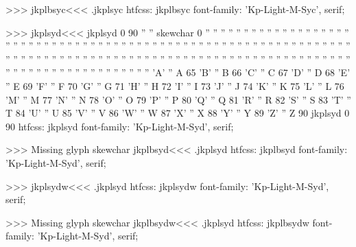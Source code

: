 >>>
\<jkplbsyc\><<<
.jkplsyc
htfcss:  jkplbsyc  font-family: 'Kp-Light-M-Syc', serif;

>>>
\<jkplsyd\><<<
jkplsyd 0 90
'' '' skewchar 0
'' ''  
'' ''  
'' ''  
'' ''  
'' ''  
'' ''  
'' ''  
'' ''  
'' ''  
'' ''  
'' ''  
'' ''  
'' ''  
'' ''  
'' ''  
'' ''  
'' ''  
'' ''  
'' ''  
'' ''  
'' ''  
'' ''  
'' ''  
'' ''  
'' ''  
'' ''  
'' ''  
'' ''  
'' ''  
'' ''  
'' ''  
'' ''  
'' ''  
'' ''  
'' ''  
'' ''  
'' ''  
'' ''  
'' ''  
'' ''  
'' ''  
'' ''  
'' ''  
'' ''  
'' ''  
'' ''  
'' ''  
'' ''  
'' ''  
'' ''  
'' ''  
'' ''  
'' ''  
'' ''  
'' ''  
'' ''  
'' ''  
'' ''  
'' ''  
'' ''  
'' ''  
'' ''  
'' ''  
'' ''  
'A' '' A 65
'B' '' B 66
'C' '' C 67
'D' '' D 68
'E' '' E 69
'F' '' F 70
'G' '' G 71
'H' '' H 72
'I' '' I 73
'J' '' J 74
'K' '' K 75
'L' '' L 76
'M' '' M 77
'N' '' N 78
'O' '' O 79
'P' '' P 80
'Q' '' Q 81
'R' '' R 82
'S' '' S 83
'T' '' T 84
'U' '' U 85
'V' '' V 86
'W' '' W 87
'X' '' X 88
'Y' '' Y 89
'Z' '' Z 90
jkplsyd 0 90
htfcss:  jkplsyd  font-family: 'Kp-Light-M-Syd', serif;

>>>
Missing glyph	skewchar
\<jkplbsyd\><<<
.jkplsyd
htfcss:  jkplbsyd  font-family: 'Kp-Light-M-Syd', serif;

>>>
\<jkplsydw\><<<
.jkplsyd
htfcss:  jkplsydw  font-family: 'Kp-Light-M-Syd', serif;

>>>
Missing glyph	skewchar
\<jkplbsydw\><<<
.jkplsyd
htfcss:  jkplbsydw  font-family: 'Kp-Light-M-Syd', serif;

